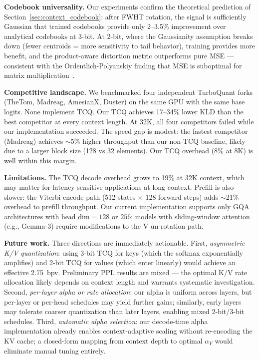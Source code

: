 \documentclass{article}
\begin{document}
\textbf{Codebook universality.} Our experiments confirm the theoretical
prediction of Section~\ref{sec:context_codebook}: after FWHT rotation, the
signal is sufficiently Gaussian that trained codebooks provide only 2--3.5\%
improvement over analytical codebooks at 3-bit. At 2-bit, where the Gaussianity
assumption breaks down (fewer centroids = more sensitivity to tail behavior),
training provides more benefit, and the product-aware distortion metric outperforms
pure MSE --- consistent with the Ordentlich-Polyanskiy finding that MSE is
suboptimal for matrix multiplication~\cite{ordentlich2024matmul}.

\textbf{Competitive landscape.} We benchmarked four independent TurboQuant forks
(TheTom, Madreag, AmesianX, Duster) on the same GPU with the same base logits.
None implement TCQ. Our TCQ achieves 17--34\% lower KLD than the best competitor
at every context length. At 32K, all four competitors failed while our
implementation succeeded. The speed gap is modest: the fastest competitor
(Madreag) achieves $\sim$5\% higher throughput than our non-TCQ baseline, likely
due to a larger block size (128 vs 32 elements). Our TCQ overhead (8\% at 8K)
is well within this margin.

\textbf{Limitations.} The TCQ decode overhead grows to 19\% at 32K context,
which may matter for latency-sensitive applications at long context. Prefill is
also slower: the Viterbi encode path (512 states $\times$ 128 forward steps)
adds $\sim$21\% overhead to prefill throughput. Our current implementation
supports only GQA architectures with $\text{head\_dim} = 128$ or $256$; models
with sliding-window attention (e.g., Gemma-3) require modifications to the V
un-rotation path.

\textbf{Future work.} Three directions are immediately actionable. First,
\emph{asymmetric K/V quantization}: using 3-bit TCQ for keys (which the softmax
exponentially amplifies) and 2-bit TCQ for values (which enter linearly) would
achieve an effective 2.75~bpv. Preliminary PPL results are mixed --- the
optimal K/V rate allocation likely depends on context length and warrants
systematic investigation. Second,
\emph{per-layer alpha or rate allocation}: our alpha is uniform
across layers, but per-layer or per-head schedules may yield further gains;
similarly, early layers may tolerate coarser quantization than later layers,
enabling mixed 2-bit/3-bit schedules. Third, \emph{automatic alpha selection}:
our decode-time alpha implementation already enables context-adaptive scaling
without re-encoding the KV cache; a closed-form mapping from context depth to
optimal $\alpha_V$ would eliminate manual tuning entirely.
\end{document}
